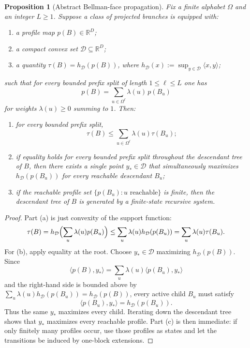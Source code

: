 \documentclass[11pt]{article}
\newtheorem{proposition}[theorem]{Proposition}
\theoremstyle{definition}
\newcommand{\R}{\mathbb{R}}
\newcommand{\1}{\mathbf{1}}
\begin{document}
\begin{proposition}[Abstract Bellman-face propagation]\label{prop:bellman-face}
Fix a finite alphabet $\Omega$ and an integer $L\ge 1$. Suppose a class of projected branches is equipped with:
\begin{enumerate}[label=(\roman*),leftmargin=2.2em]
\item a profile map $p(B)\in \R^D$;
\item a compact convex set $\mathcal D\subseteq \R^D$;
\item a quantity $\tau(B)=h_{\mathcal D}(p(B))$, where $h_{\mathcal D}(x):=\sup_{y\in \mathcal D}\langle x,y\rangle$;
\end{enumerate}
such that for every bounded prefix split of length $1\le \ell\le L$ one has
\[
p(B)=\sum_{u\in \Omega^\ell}\lambda(u)\,p(B_u)
\]
for weights $\lambda(u)\ge 0$ summing to $1$. Then:
\begin{enumerate}[label=(\alph*),leftmargin=2.2em]
\item for every bounded prefix split,
\[
\tau(B)\le \sum_{u\in \Omega^\ell}\lambda(u)\tau(B_u);
\]
\item if equality holds for every bounded prefix split throughout the descendant tree of $B$, then there exists a single point $y_*\in \mathcal D$ that simultaneously maximizes $h_{\mathcal D}(p(B_u))$ for every reachable descendant $B_u$;
\item if the reachable profile set $\{p(B_u):u\text{ reachable}\}$ is finite, then the descendant tree of $B$ is generated by a finite-state recursive system.
\end{enumerate}
\end{proposition}

\begin{proof}
Part (a) is just convexity of the support function:
\[
\tau(B)=h_{\mathcal D}\Bigl(\sum_u \lambda(u)p(B_u)\Bigr)
\le \sum_u \lambda(u)h_{\mathcal D}(p(B_u))
=\sum_u \lambda(u)\tau(B_u).
\]
For (b), apply equality at the root. Choose $y_*\in \mathcal D$ maximizing $h_{\mathcal D}(p(B))$. Since
\[
\langle p(B),y_*\rangle=\sum_u \lambda(u)\langle p(B_u),y_*\rangle
\]
and the right-hand side is bounded above by $\sum_u \lambda(u)h_{\mathcal D}(p(B_u))=h_{\mathcal D}(p(B))$, every active child $B_u$ must satisfy
\[
\langle p(B_u),y_*\rangle=h_{\mathcal D}(p(B_u)).
\]
Thus the same $y_*$ maximizes every child. Iterating down the descendant tree shows that $y_*$ maximizes every reachable profile. Part (c) is then immediate: if only finitely many profiles occur, use those profiles as states and let the transitions be induced by one-block extensions.
\end{proof}
\end{document}
